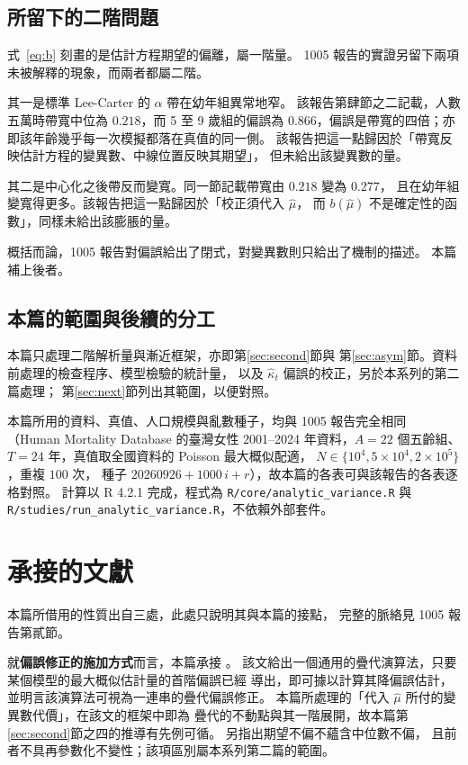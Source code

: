 \documentclass[UTF8, fontset=macnew, a4paper, 12pt]{ctexart}
\begin{document}
\subsection{所留下的二階問題}

式~\eqref{eq:b} 刻畫的是估計方程期望的偏離，屬一階量。
1005 報告的實證另留下兩項未被解釋的現象，而兩者都屬二階。

其一是標準 Lee-Carter 的 $\alpha$ 帶在幼年組異常地窄。
該報告第肆節之二記載，人數五萬時帶寬中位為 $0.218$，而 5 至 9 歲組的偏誤為
$0.866$，偏誤是帶寬的四倍；亦即該年齡幾乎每一次模擬都落在真值的同一側。
該報告把這一點歸因於「帶寬反映估計方程的變異數、中線位置反映其期望」，
但未給出該變異數的量。

其二是中心化之後帶反而變寬。同一節記載帶寬由 $0.218$ 變為 $0.277$，
且在幼年組變寬得更多。該報告把這一點歸因於「校正須代入 $\hat\mu$，
而 $b(\hat\mu)$ 不是確定性的函數」，同樣未給出該膨脹的量。

概括而論，1005 報告對偏誤給出了閉式，對變異數則只給出了機制的描述。
本篇補上後者。

\subsection{本篇的範圍與後續的分工}

本篇只處理二階解析量與漸近框架，亦即第\ref{sec:second}節與
第\ref{sec:asym}節。資料前處理的檢查程序、模型檢驗的統計量，
以及 $\hat\kappa_t$ 偏誤的校正，另於本系列的第二篇處理；
第\ref{sec:next}節列出其範圍，以便對照。

本篇所用的資料、真值、人口規模與亂數種子，均與 1005 報告完全相同
（Human Mortality Database 的臺灣女性 2001--2024 年資料，$A=22$ 個五齡組、
$T=24$ 年，真值取全國資料的 Poisson 最大概似配適，
$N\in\{10^4,5\times10^4,2\times10^5\}$，重複 $100$ 次，
種子 $20260926+1000\,i+r$），故本篇的各表可與該報告的各表逐格對照。
計算以 R 4.2.1 完成，程式為 \texttt{R/core/analytic\_variance.R} 與
\texttt{R/studies/run\_analytic\_variance.R}，不依賴外部套件。

\section{承接的文獻}\label{sec:lit}

本篇所借用的性質出自三處，此處只說明其與本篇的接點，
完整的脈絡見 1005 報告第貳節。

就\textbf{偏誤修正的施加方式}而言，本篇承接 \citet{kosmidis2010}。
該文給出一個通用的疊代演算法，只要某個模型的最大概似估計量的首階偏誤已經
導出，即可據以計算其降偏誤估計，並明言該演算法可視為一連串的疊代偏誤修正。
本篇所處理的「代入 $\hat\mu$ 所付的變異數代價」，在該文的框架中即為
疊代的不動點與其一階展開，故本篇第\ref{sec:second}節之四的推導有先例可循。
\citet{kennepagui2017} 另指出期望不偏不蘊含中位數不偏，
且前者不具再參數化不變性；該項區別屬本系列第二篇的範圍。
\end{document}

